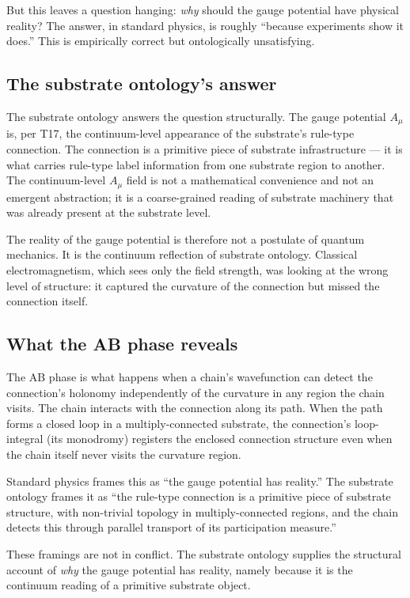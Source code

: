\documentclass[11pt,a4paper]{article}
\begin{document}
But this leaves a question hanging: \emph{why} should the gauge potential have physical reality? The answer, in standard physics, is roughly ``because experiments show it does.'' This is empirically correct but ontologically unsatisfying.

\subsection{The substrate ontology's answer}

The substrate ontology answers the question structurally. The gauge potential $A_\mu$ is, per T17, the continuum-level appearance of the substrate's rule-type connection. The connection is a primitive piece of substrate infrastructure --- it is what carries rule-type label information from one substrate region to another. The continuum-level $A_\mu$ field is not a mathematical convenience and not an emergent abstraction; it is a coarse-grained reading of substrate machinery that was already present at the substrate level.

The reality of the gauge potential is therefore not a postulate of quantum mechanics. It is the continuum reflection of substrate ontology. Classical electromagnetism, which sees only the field strength, was looking at the wrong level of structure: it captured the curvature of the connection but missed the connection itself.

\subsection{What the AB phase reveals}

The AB phase is what happens when a chain's wavefunction can detect the connection's holonomy independently of the curvature in any region the chain visits. The chain interacts with the connection along its path. When the path forms a closed loop in a multiply-connected substrate, the connection's loop-integral (its monodromy) registers the enclosed connection structure even when the chain itself never visits the curvature region.

Standard physics frames this as ``the gauge potential has reality.'' The substrate ontology frames it as ``the rule-type connection is a primitive piece of substrate structure, with non-trivial topology in multiply-connected regions, and the chain detects this through parallel transport of its participation measure.''

These framings are not in conflict. The substrate ontology supplies the structural account of \emph{why} the gauge potential has reality, namely because it is the continuum reading of a primitive substrate object.
\end{document}
